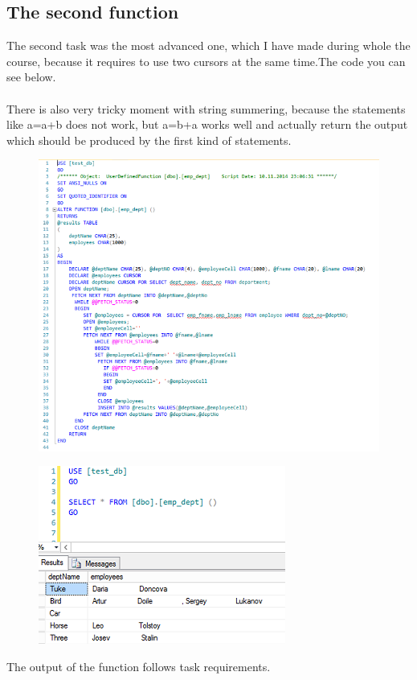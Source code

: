 \documentclass[english]{article}
\begin{document}
\subsection{The second function}
The second task was the most advanced one, which I have made during whole the course, because it requires to use two cursors at the same time.The code you can see below.\\\\
 There is also very tricky moment with string summering, because the statements like a=a+b does not work, but a=b+a works well and actually return the output which should be produced by the first kind of statements.
\begin{figure}[H]
\centerline{\includegraphics[scale=0.8]{FunctionsSQLServer/secondSource}}
\end{figure}
\begin{figure}[H]
\centerline{\includegraphics[scale=0.8]{FunctionsSQLServer/secondOutput}}
\end{figure}
The output of the function follows task requirements.
\end{document}
